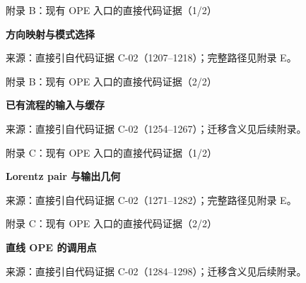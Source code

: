 \documentclass[UTF8,aspectratio=169,11pt]{ctexbeamer}
\newcommand{\source}[1]{%
  \par\vspace{0.05em}%
  {\raggedright\scriptsize\color{muted}来源：#1\par}}
\begin{document}
\begin{frame}[t]{附录 B：现有 OPE 入口的直接代码证据（1/2）}
  \begin{center}
    \begin{minipage}{0.91\textwidth}
      \textbf{方向映射与模式选择}\par\vspace{0.2em}
      
    \end{minipage}
  \end{center}
  \source{直接引自代码证据 C-02（1207--1218）；完整路径见附录 E。}
\end{frame}

\begin{frame}[t]{附录 B：现有 OPE 入口的直接代码证据（2/2）}
  \begin{center}
    \begin{minipage}{0.91\textwidth}
      \textbf{已有流程的输入与缓存}\par\vspace{0.2em}
      
    \end{minipage}
  \end{center}
  \source{直接引自代码证据 C-02（1254--1267）；迁移含义见后续附录。}
\end{frame}

\begin{frame}[t]{附录 C：现有 OPE 入口的直接代码证据（1/2）}
  \begin{center}
    \begin{minipage}{0.91\textwidth}
      \textbf{Lorentz pair 与输出几何}\par\vspace{0.2em}
      
    \end{minipage}
  \end{center}
  \source{直接引自代码证据 C-02（1271--1282）；完整路径见附录 E。}
\end{frame}

\begin{frame}[t]{附录 C：现有 OPE 入口的直接代码证据（2/2）}
  \begin{center}
    \begin{minipage}{0.91\textwidth}
      \textbf{直线 OPE 的调用点}\par\vspace{0.2em}
      
    \end{minipage}
  \end{center}
  \source{直接引自代码证据 C-02（1284--1298）；迁移含义见后续附录。}
\end{frame}
\end{document}
